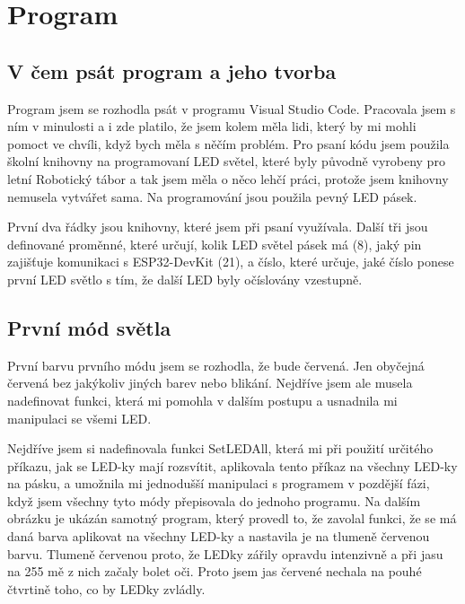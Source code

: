 \chapter{Program}

\section{V čem psát program a jeho tvorba}

Program jsem se rozhodla psát v programu Visual Studio Code. Pracovala jsem s ním v minulosti a i zde platilo, že jsem kolem měla lidi, který by mi mohli pomoct ve chvíli, když bych měla s něčím problém. Pro psaní kódu jsem použila školní knihovny na programovaní LED světel, které byly původně vyrobeny pro letní Robotický tábor a tak jsem měla o něco lehčí práci, protože jsem knihovny nemusela vytvářet sama.  
Na programování jsou použila pevný LED pásek.



%



První dva řádky jsou knihovny, které jsem při psaní využívala. Další tři jsou definované proměnné, které určují, kolik LED světel pásek má (8), jaký pin zajišťuje komunikaci s ESP32-DevKit (21), a číslo, které určuje, jaké číslo ponese první LED světlo s tím,  že další LED byly očíslovány vzestupně.

\newpage

\section{První mód světla}
První barvu prvního módu jsem se rozhodla, že bude červená. Jen obyčejná červená bez jakýkoliv jiných barev nebo blikání. Nejdříve jsem ale musela nadefinovat funkci, která mi pomohla v dalším postupu a usnadnila mi manipulaci se všemi LED. 

%



Nejdříve jsem si nadefinovala funkci SetLEDAll, která mi při použití určitého příkazu, jak se LED-ky mají rozsvítit, aplikovala tento příkaz na všechny LED-ky na pásku, a umožnila mi jednodušší manipulaci s programem v pozdější fázi, když jsem všechny tyto módy přepisovala do jednoho programu. 
Na dalším obrázku %
 je ukázán samotný program, který provedl to, že zavolal funkci, že se má daná barva aplikovat na všechny LED-ky a nastavila je na tlumeně červenou barvu. Tlumeně červenou proto, že LEDky zářily opravdu intenzivně a při jasu na 255 mě z nich začaly bolet oči. Proto jsem jas červené nechala na pouhé čtvrtině toho, co by LEDky zvládly.


